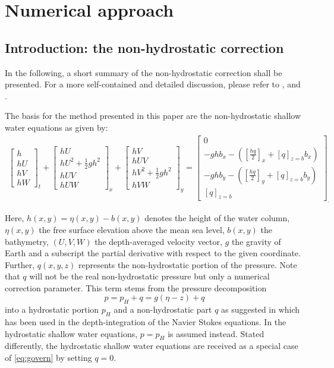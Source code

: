 
\section{Numerical approach}
\subsection{Introduction: the non-hydrostatic correction}
In the following, a short summary of the non-hydrostatic correction shall be presented. For a more self-contained and detailed discussion, please refer to  \cite{samfass14extension}, \cite{cui} and \cite{fuchs}. 

The basis for the method presented in this paper are the non-hydrostatic shallow water equations as given by:
\begin{align}
\boxed{
{\begin{bmatrix}
h \\
hU\\
hV\\
hW
\end{bmatrix}}_{t}
+
{\begin{bmatrix}
hU \\
hU^2+\frac{1}{2}gh^2\\
hUV\\
hUW
\end{bmatrix}}_{x}
+
{\begin{bmatrix}
hV \\
hUV\\
hV^2+\frac{1}{2}gh^2\\
hVW
\end{bmatrix}}_{y}
=
{\begin{bmatrix}
0 \\
-ghb_x -\left([ \frac{hq}{2}]_x+[q]_{z=b}b_x \right)\\
-ghb_y -\left([ \frac{hq}{2}]_y+[q]_{z=b}b_y \right)\\
[q]_{z=b}
\end{bmatrix}_.}}
\label{eq:govern}
\end{align}

Here, $h (x,y)=\eta (x,y) -b(x,y)$ denotes the height of the water column, $\eta (x,y)$ the free surface elevation above the mean sea level, $b (x,y)$ the bathymetry, $(U,V,W)$ the depth-averaged velocity vector, $g$ the gravity of Earth and a subscript the partial derivative with respect to the given coordinate. Further, $q (x,y,z)$ represents the non-hydrostatic portion of the pressure. Note that $q$ will not be the real non-hydrostatic pressure but only a numerical correction parameter. This term stems from the pressure decomposition
\begin{equation}
p= p_H + q = g (\eta -z) +q
\end{equation}
into a hydrostatic portion $p_H$ and a non-hydrostatic part $q$ as suggested in \cite{casu} which has been used in the depth-integration of the Navier Stokes equations. In the hydrostatic shallow water equations, $p=p_H$ is assumed instead. Stated differently, the hydrostatic shallow water equations are received as a special case of \eqref{eq:govern} by setting $q=0$. 

